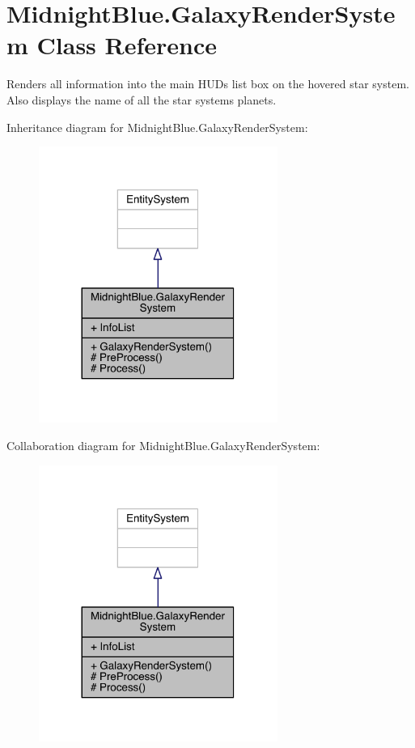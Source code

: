 \hypertarget{class_midnight_blue_1_1_galaxy_render_system}{}\section{Midnight\+Blue.\+Galaxy\+Render\+System Class Reference}
\label{class_midnight_blue_1_1_galaxy_render_system}


Renders all information into the main H\+UD\textquotesingle{}s list box on the hovered star system. Also displays the name of all the star systems planets.  




Inheritance diagram for Midnight\+Blue.\+Galaxy\+Render\+System\+:
\nopagebreak
\begin{figure}[H]
\begin{center}
\leavevmode
\includegraphics[width=221pt]{class_midnight_blue_1_1_galaxy_render_system__inherit__graph}
\end{center}
\end{figure}


Collaboration diagram for Midnight\+Blue.\+Galaxy\+Render\+System\+:
\nopagebreak
\begin{figure}[H]
\begin{center}
\leavevmode
\includegraphics[width=221pt]{class_midnight_blue_1_1_galaxy_render_system__coll__graph}
\end{center}
\end{figure}

